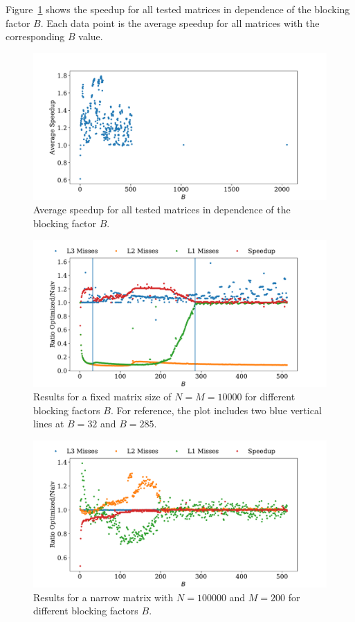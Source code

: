 \documentclass[a4paper, 11pt]{article}
\begin{document}
Figure~\ref{fig:all_runs} shows the speedup for all tested matrices in
dependence of the blocking factor $B$. Each data point is the average speedup
for all matrices with the corresponding $B$ value.
\begin{figure}
  \centering
  \includegraphics[width=\textwidth]{../plot/speedup_for_all_bs.pdf}
  \caption{Average speedup for all tested matrices in dependence of the blocking factor $B$.}
  \label{fig:all_runs}
\end{figure}

\begin{figure}
  \centering
  \includegraphics[width=\textwidth]{../plot/square_against_B.pdf}
  \caption{Results for a fixed matrix size of $N = M = 10000$ for different
  blocking factors $B$. For reference, the plot includes two blue vertical lines
  at $B=32$ and $B=285$.}
  \label{fig:square_against_B}
\end{figure}

\begin{figure}
  \centering
  \includegraphics[width=\textwidth]{../plot/narrow_against_B.pdf}
  \caption{Results for a narrow matrix with $N=100000$ and $M=200$ for different blocking factors $B$.}
  \label{fig:narrow_against_B}
\end{figure}
\end{document}
